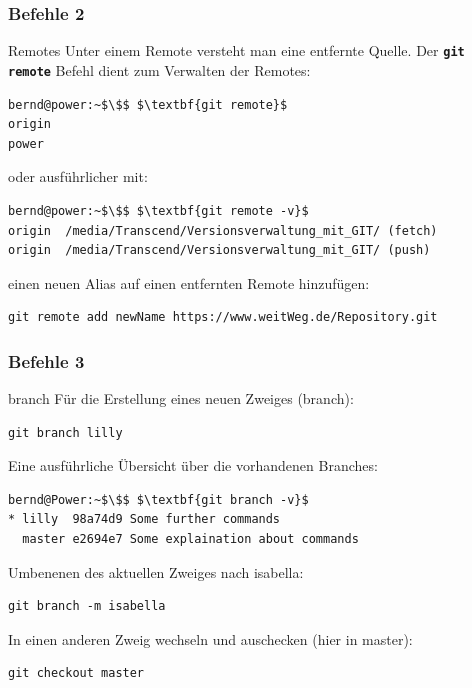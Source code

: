 \documentclass{beamer}
\begin{document}
\begin{frame}[fragile]\frametitle{Befehle 2}
\begin{block} {Remotes}
Unter einem Remote versteht man eine entfernte Quelle. Der \textbf{\lstinline|git remote|} Befehl dient zum Verwalten der Remotes:
\begin{lstlisting}[mathescape=true]
bernd@power:~$\$$ $\textbf{git remote}$
origin
power
\end{lstlisting}
%

oder ausführlicher mit:
\begin{lstlisting}[mathescape=true]
bernd@power:~$\$$ $\textbf{git remote -v}$
origin  /media/Transcend/Versionsverwaltung_mit_GIT/ (fetch)
origin  /media/Transcend/Versionsverwaltung_mit_GIT/ (push)
\end{lstlisting}
%

einen neuen Alias auf einen entfernten Remote hinzufügen:
\begin{lstlisting}
git remote add newName https://www.weitWeg.de/Repository.git
\end{lstlisting}
\end{block}
\end{frame}

\begin{frame}[fragile]\frametitle{Befehle 3}
\begin{block} {branch}
Für die Erstellung eines neuen Zweiges (branch):
\begin{lstlisting}
git branch lilly
\end{lstlisting}

Eine ausführliche Übersicht über die vorhandenen Branches:
\begin{lstlisting}[mathescape=true]
bernd@Power:~$\$$ $\textbf{git branch -v}$
* lilly  98a74d9 Some further commands
  master e2694e7 Some explaination about commands
\end{lstlisting} %

Umbenenen des aktuellen Zweiges nach isabella:
\begin{lstlisting}
git branch -m isabella
\end{lstlisting}

In einen anderen Zweig wechseln und auschecken (hier in master):
\begin{lstlisting}
git checkout master
\end{lstlisting}

\end{block}
\end{frame}
\end{document}
